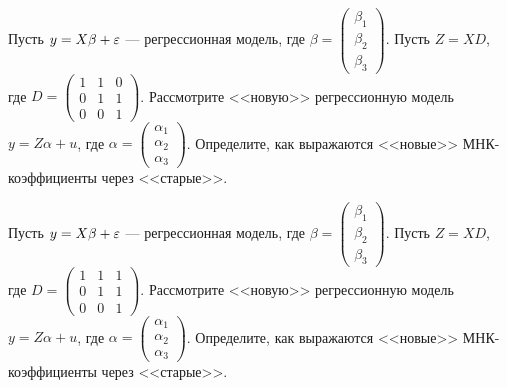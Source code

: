 \documentclass[pdftex,11pt,openany]{book}\usepackage[]{graphicx}\usepackage[]{color}
\begin{document}
\begin{solution}
\end{solution}


\begin{problem} 
Пусть $y = X\beta + \varepsilon$ --- регрессионная модель, где $\beta = \begin{pmatrix} \beta_1 \\ \beta_2 \\ \beta_3 \end{pmatrix}$. Пусть $Z = XD$, где $D = \begin{pmatrix} 1 & 1 & 0 \\ 0 & 1 & 1 \\ 0 & 0 & 1 \end{pmatrix}$. Рассмотрите <<новую>> регрессионную модель $y = Z\alpha + u$, где $\alpha = \begin{pmatrix} \alpha_1 \\ \alpha_2 \\ \alpha_3 \end{pmatrix}$. Определите, как выражаются <<новые>> МНК-коэффициенты через <<старые>>.

\end{problem}

\begin{solution}
\end{solution}


\begin{problem}
Пусть $y = X\beta + \varepsilon$ --- регрессионная модель, где $\beta = \begin{pmatrix} \beta_1 \\ \beta_2 \\ \beta_3 \end{pmatrix}$. Пусть $Z = XD$, где $D = \begin{pmatrix} 1 & 1 & 1 \\ 0 & 1 & 1 \\ 0 & 0 & 1 \end{pmatrix}$. Рассмотрите <<новую>> регрессионную модель $y = Z\alpha + u$, где $\alpha = \begin{pmatrix} \alpha_1 \\ \alpha_2 \\ \alpha_3 \end{pmatrix}$. Определите, как выражаются <<новые>> МНК-коэффициенты через <<старые>>.

\end{problem}

\begin{solution}
\end{solution}
\end{document}
